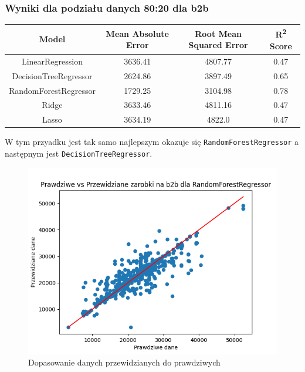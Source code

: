 \documentclass[a4paper]{article}
\begin{document}
\subsubsection{Wyniki dla podziału danych 80:20 dla b2b}

\begin{table}[H]
    \centering
    \begin{tabular}{|c|c|c|c|}
        \hline
        \textbf{Model}        & \textbf{Mean Absolute Error} & \textbf{Root Mean Squared Error} & \textbf{R\textsuperscript{2} Score} \\ \hline
        LinearRegression      & 3636.41                      & 4807.77                          & 0.47                                \\ \hline
        DecisionTreeRegressor & 2624.86                      & 3897.49                          & 0.65                                \\ \hline
        RandomForestRegressor & 1729.25                      & 3104.98                          & 0.78                                \\ \hline
        Ridge                 & 3633.46                      & 4811.16                          & 0.47                                \\ \hline
        Lasso                 & 3634.19                      & 4822.0                           & 0.47                                \\ \hline
    \end{tabular}
\end{table}

\quad W tym przyadku jest tak samo najlepszym okazuje się \texttt{RandomForestRegressor} a następnym
jest \texttt{DecisionTreeRegressor}.


\begin{figure}[H]
    \centering
    \includegraphics[width=\textwidth]{../analysis/plots/wyniki/0.8&0.2/b2b/RandomForestRegressor/scatter.png}
    \caption{Dopasowanie danych przewidzianych do prawdziwych}
\end{figure}
\end{document}
